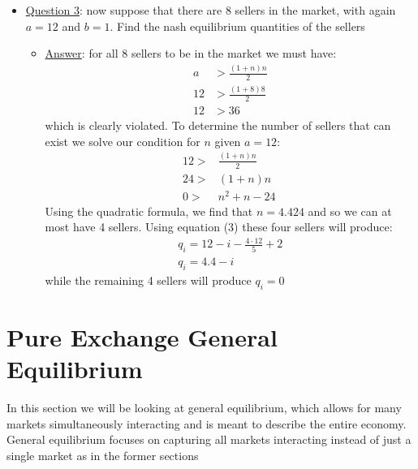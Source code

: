 \documentclass{article}
\begin{document}
  \begin{itemize}
    \item  \underline{Question 3}: now suppose that there are 8 sellers in the market, with again $a = 12$ and $b=1$. Find the nash equilibrium quantities of the sellers
    \begin{itemize}
      \item  \underline{Answer}: for all 8 sellers to be in the market we must have:
      \begin{align*}
        a &> \frac{(1+n)n}{2} \\
        12 &> \frac{(1+8)8}{2} \\
        12 &> 36
      \end{align*}
      which is clearly violated. To determine the number of sellers that can exist we solve our condition for $n$ given $a=12$:
      \begin{align*}
        12 >& \frac{(1+n)n}{2} \\
        24 >& (1+n)n \\
        0 >& n^{2} + n - 24 \
      \end{align*}
      Using the quadratic formula, we find that $n = 4.424$ and so we can at most have 4 sellers. Using equation (3) these four sellers will produce:
      \begin{gather*}
        q_{i} = 12 - i - \frac{4 \cdot 12}{5} + 2 \\
        q_{i} = 4.4 - i
      \end{gather*}
      while the remaining 4 sellers will produce $q_{i} = 0$
    \end{itemize}
  \end{itemize}
\par

\newpage

\section{Pure Exchange General Equilibrium}
In this section we will be looking at general equilibrium, which allows for many markets simultaneously interacting and is meant to describe the entire economy. General equilibrium focuses on capturing all markets interacting instead of just a single market as in the former sections
\vspace{6mm}
\end{document}

